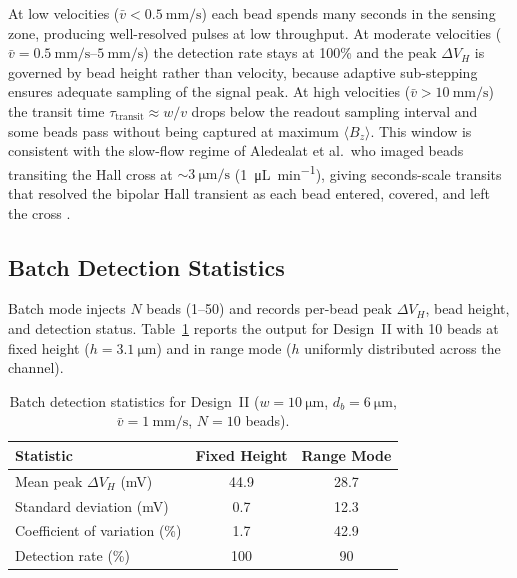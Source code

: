 \documentclass[biosensors,article,submit,pdftex,moreauthors]{Definitions/mdpi}
\begin{document}
At low velocities ($\bar{v} < \SI{0.5}{\milli\meter\per\second}$) each bead spends many
seconds in the sensing zone, producing well-resolved pulses at low throughput. At
moderate velocities ($\bar{v} = \SIrange{0.5}{5}{\milli\meter\per\second}$) the
detection rate stays at 100\% and the peak $\Delta V_H$ is governed by bead height
rather than velocity, because adaptive sub-stepping ensures adequate sampling of the
signal peak. At high velocities ($\bar{v} > \SI{10}{\milli\meter\per\second}$) the
transit time $\tau_\text{transit} \approx w/v$ drops below the readout sampling
interval and some beads pass without being captured at maximum $\langle B_z\rangle$.
This window is consistent with the slow-flow regime of Aledealat et al.\, who
imaged beads transiting the Hall cross at ${\sim}\SI{3}{\micro\meter\per\second}$
(\SI{1}{\micro\liter\per\minute}), giving seconds-scale transits that resolved the
bipolar Hall transient as each bead entered, covered, and left the cross
\cite{aledealat2009}.

\subsection{Batch Detection Statistics}
\label{sec:batch}

Batch mode injects $N$ beads (1--50) and records per-bead peak $\Delta V_H$, bead
height, and detection status. Table~\ref{tab:batch} reports the output for Design~II
with 10 beads at fixed height ($h = \SI{3.1}{\micro\meter}$) and in range mode
($h$ uniformly distributed across the channel).

\begin{table}[H]
\caption{Batch detection statistics for Design~II ($w = \SI{10}{\micro\meter}$,
$d_b = \SI{6}{\micro\meter}$, $\bar{v} = \SI{1}{\milli\meter\per\second}$,
$N = 10$ beads).\label{tab:batch}}
\begin{tabularx}{\textwidth}{Xcc}
\toprule
\textbf{Statistic} & \textbf{Fixed Height} & \textbf{Range Mode} \\
\midrule
Mean peak $\Delta V_H$ (mV)      & 44.9 & 28.7 \\
Standard deviation (mV)          & 0.7  & 12.3 \\
Coefficient of variation (\%)    & 1.7  & 42.9 \\
Detection rate (\%)              & 100  & 90 \\
\bottomrule
\end{tabularx}
\end{table}
\end{document}
